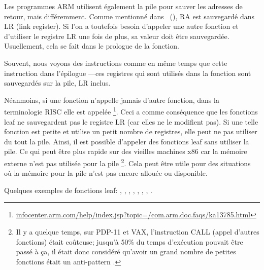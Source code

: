 
Les programmes ARM utilisent également la pile pour sauver les adresses de retour,
mais différemment.
Comme mentionné dans \q{\HelloWorldSectionName}~(),
\ac{RA} est sauvegardé dans \ac{LR} (\gls{link register}).
Si l'on a toutefois besoin d'appeler une autre fonction et d'utiliser le registre
\ac{LR} une fois de plus, sa valeur doit être sauvegardée.
Usuellement, cela se fait dans le prologue de la fonction.

Souvent, nous voyons des instructions comme  en même temps
que cette instruction dans l'épilogue ---ces registres qui
sont utilisés dans la fonction sont sauvegardés sur la pile, \ac{LR} inclus.

Néanmoins, si une fonction n'appelle jamais d'autre fonction, dans la terminologie
\ac{RISC} elle est appelée \footnote{\href{http://go.yurichev.com/17064}{infocenter.arm.com/help/index.jsp?topic=/com.arm.doc.faqs/ka13785.html}}.
Ceci a comme conséquence que les fonctions leaf ne sauvegardent pas le registre
\ac{LR} (car elles ne le modifient pas).
Si une telle fonction est petite et utilise un petit nombre de registres, elle
peut ne pas utiliser du tout la pile.
Ainsi, il est possible d'appeler des fonctions leaf sans utiliser la pile.
Ce qui peut être plus rapide sur des vieilles machines x86 car la mémoire externe
n'est pas utilisée pour la pile
\footnote{Il y a quelque temps, sur PDP-11 et VAX, l'instruction CALL (appel d'autres fonctions) était coûteuse; jusqu'à 50\%
du temps d'exécution pouvait être passé à ça, il était donc considéré qu'avoir un grand nombre de petites fonctions était un \gls{anti-pattern} .}.
Cela peut être utile pour des situations où la mémoire pour la pile n'est pas
encore allouée ou disponible.

Quelques exemples de fonctions leaf:
, ,
, , ,
, , .

